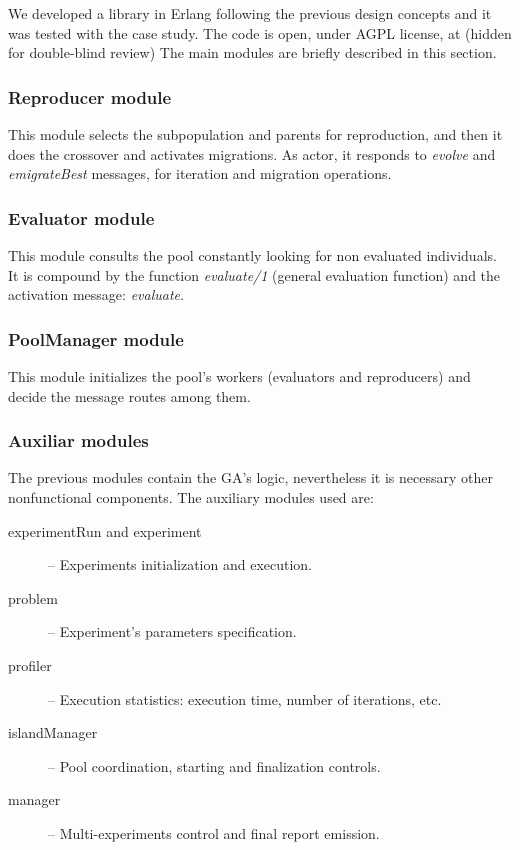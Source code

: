
We developed a library in Erlang following the previous design concepts and it was tested with the case study. The code is open, under AGPL license, at 
(hidden for double-blind review)
The main modules are briefly described in this section. %

\subsubsection{Reproducer module}

This module selects the subpopulation and parents for reproduction, and then it does the crossover and activates migrations. As actor, it responds to {\em evolve} and {\em emigrateBest} messages, for iteration and migration operations.

\subsubsection{Evaluator module}

This module consults the pool constantly looking for non evaluated individuals. It is compound by the function {\em evaluate/1} (general evaluation function) and the activation message: {\em evaluate}.

\subsubsection{PoolManager module}

This module initializes the pool’s workers (evaluators and reproducers) and decide the message routes among them.

\subsubsection{Auxiliar modules}

The previous modules contain the GA’s logic, nevertheless it is necessary other nonfunctional components. The auxiliary modules used are:
\vspace{.35cm}

\begin{description}

  \item[experimentRun and experiment] -- Experiments initialization and execution.

  \item[problem] -- Experiment’s parameters specification.

  \item[profiler] -- Execution statistics: execution time, number of iterations, etc.

  \item[islandManager] -- Pool coordination, starting and finalization controls.

  \item[manager] -- Multi-experiments control and final report emission.

\end{description} 